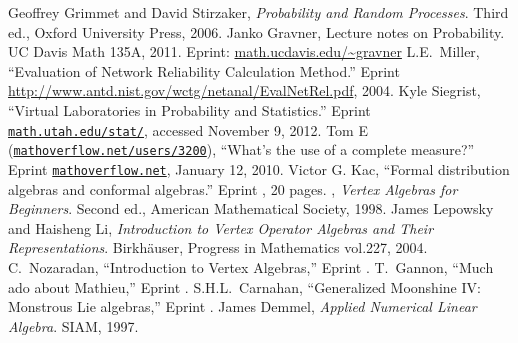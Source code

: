 \begin{thebibliography}{99}\small
{}
Geoffrey Grimmet and David Stirzaker,\newblock
\emph{Probability and Random Processes}.\newblock
Third ed., Oxford University Press, 2006.
Janko Gravner,\newblock
Lecture notes on Probability.\newblock
UC Davis Math 135A, 2011. Eprint: \href{http://www.math.ucdavis.edu/~gravner/MAT135A/resources/lecturenotes.pdf}{\url{math.ucdavis.edu/~gravner}}
L.E.~Miller,\newblock
``Evaluation of Network Reliability Calculation Method.''\newblock
Eprint \url{http://www.antd.nist.gov/wctg/netanal/EvalNetRel.pdf}, 2004.
Kyle Siegrist,\newblock
``Virtual Laboratories in Probability and Statistics.''\newblock
Eprint \href{http://www.math.uah.edu/stat/index.html}{\tt math.utah.edu/stat/}, accessed November
9, 2012.
 Tom E (\href{http://mathoverflow.net/users/3200/tom-e}{\tt mathoverflow.net/users/3200}),\newblock 
``What's the use of a complete measure?''\newblock
Eprint \href{http://mathoverflow.net/questions/11554}{\tt mathoverflow.net}, January 12, 2010.
Victor G. Kac,\newblock
``Formal distribution algebras and conformal algebras.''\newblock
Eprint , 20 pages.
  \bysame,\newblock
  \emph{Vertex Algebras for Beginners}.\newblock
  Second ed., American Mathematical Society, 1998.
  James Lepowsky and Haisheng Li, \newblock
  \emph{Introduction to Vertex Operator Algebras and Their Representations}.\newblock
  Birkh\"auser, Progress in Mathematics vol.227, 2004.
  C.~Nozaradan,\newblock
  ``Introduction to Vertex Algebras,''\newblock
  Eprint .
  T.~Gannon,\newblock
  ``Much ado about Mathieu,''\newblock
  Eprint .
  S.H.L.~Carnahan,\newblock
  ``Generalized Moonshine IV: Monstrous Lie algebras,''\newblock
  Eprint .
  James Demmel,\newblock
  \emph{Applied Numerical Linear Algebra}.\newblock
  SIAM, 1997.
\end{thebibliography}
